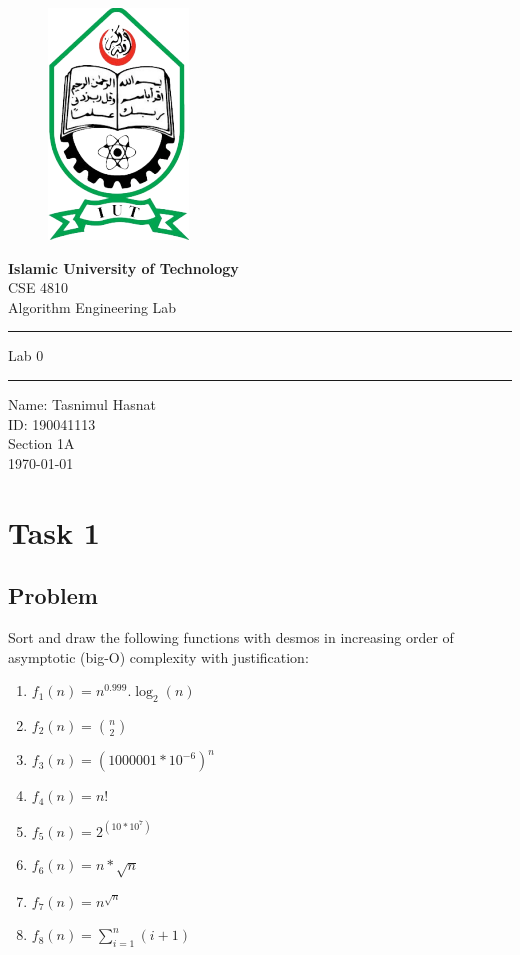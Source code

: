 \documentclass[12pt, a4paper]{article}
\begin{document}
\begin{titlepage}
    \begin{figure}[!h]
    \centering
    \includegraphics[width=.2\textwidth]{logo iut.png}
\end{figure}
\begin{center}
\Huge{\textbf{Islamic University of Technology}}\\
\vspace{1.5cm}
\large{CSE 4810}\\
\large{Algorithm Engineering Lab}

\noindent\rule{\textwidth}{1.5pt}
\Large{Lab 0} \\
\noindent\rule{\textwidth}{1.5pt}
\end{center}


\vspace{0.5cm}
\begin{center}
    \large{
    Name: Tasnimul Hasnat\\
    ID: 190041113\\
    Section 1A\\
    }
 \today
\end{center}

\end{titlepage}


\thispagestyle{empty}
{
  \hypersetup{linkcolor=black}
  \tableofcontents
}


\newpage
{}
\section{Task 1}
\subsection{Problem}
Sort and draw the following functions with desmos in increasing order of asymptotic (big-O) complexity with justification:
\begin{enumerate}
    \item $f_1(n) = n^{0.999}.\log_2(n)$
    \item $f_2(n) = \binom{n}{2}$
    \item $f_3(n) = (1000001 * 10^{-6})^{n}$
    \item $f_4(n) = n!$
    \item $f_5(n) = 2^{(10*10^{7})}$
    \item $f_6(n) = n*\sqrt{n}$
    \item $f_7(n) = n^{\sqrt{n}}$
    \item $f_8(n) = \sum_{i=1}^{n} (i+1)$    
\end{enumerate}
\end{document}
